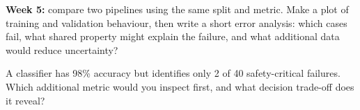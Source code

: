 \begin{labbox}
\textbf{Week 5:} compare two pipelines using the same split and metric. Make a plot of training and validation behaviour, then write a short error analysis: which cases fail, what shared property might explain the failure, and what additional data would reduce uncertainty?
\end{labbox}

\begin{checkpointbox}
A classifier has 98\% accuracy but identifies only 2 of 40 safety-critical failures. Which additional metric would you inspect first, and what decision trade-off does it reveal?
\end{checkpointbox}
